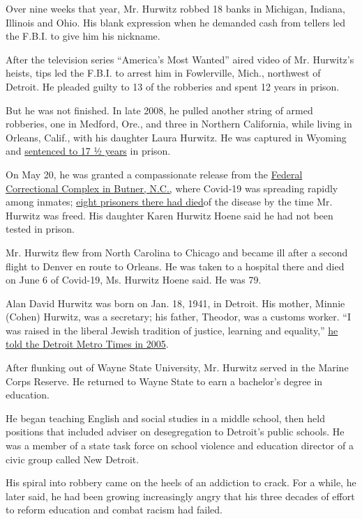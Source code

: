 Over nine weeks that year, Mr. Hurwitz robbed 18 banks in Michigan,
Indiana, Illinois and Ohio. His blank expression when he demanded cash
from tellers led the F.B.I. to give him his nickname.

After the television series ``America's Most Wanted'' aired video of Mr.
Hurwitz's heists, tips led the F.B.I. to arrest him in Fowlerville,
Mich., northwest of Detroit. He pleaded guilty to 13 of the robberies
and spent 12 years in prison.

But he was not finished. In late 2008, he pulled another string of armed
robberies, one in Medford, Ore., and three in Northern California, while
living in Orleans, Calif., with his daughter Laura Hurwitz. He was
captured in Wyoming and
\href{https://archives.fbi.gov/archives/portland/press-releases/2010/pd011910.htm}{sentenced
to 17 ½ years} in prison.

On May 20, he was granted a compassionate release from the
\href{https://www.bop.gov/locations/institutions/buf/}{Federal
Correctional Complex in Butner, N.C.,} where Covid-19 was spreading
rapidly among inmates;
\href{https://www.newsobserver.com/news/local/article242837511.html}{eight
prisoners there had died}of the disease by the time Mr. Hurwitz was
freed. His daughter Karen Hurwitz Hoene said he had not been tested in
prison.

Mr. Hurwitz flew from North Carolina to Chicago and became ill after a
second flight to Denver en route to Orleans. He was taken to a hospital
there and died on June 6 of Covid-19, Ms. Hurwitz Hoene said. He was 79.

Alan David Hurwitz was born on Jan. 18, 1941, in Detroit. His mother,
Minnie (Cohen) Hurwitz, was a secretary; his father, Theodor, was a
customs worker. ``I was raised in the liberal Jewish tradition of
justice, learning and equality,''
\href{https://www.metrotimes.com/detroit/back-to-life/Content?oid=2181608}{he
told the Detroit Metro Times in 2005}.

After flunking out of Wayne State University, Mr. Hurwitz served in the
Marine Corps Reserve. He returned to Wayne State to earn a bachelor's
degree in education.

He began teaching English and social studies in a middle school, then
held positions that included adviser on desegregation to Detroit's
public schools. He was a member of a state task force on school violence
and education director of a civic group called New Detroit.

His spiral into robbery came on the heels of an addiction to crack. For
a while, he later said, he had been growing increasingly angry that his
three decades of effort to reform education and combat racism had
failed.

